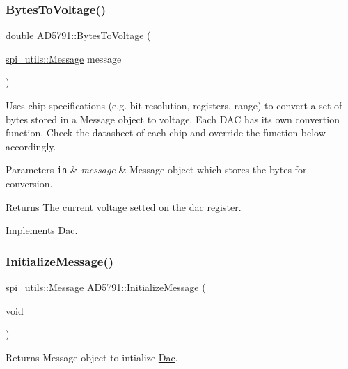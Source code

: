\subsubsection{\texorpdfstring{Bytes\+To\+Voltage()}{BytesToVoltage()}}
{\footnotesize\ttfamily double A\+D5791\+::\+Bytes\+To\+Voltage (\begin{DoxyParamCaption}\item[{\mbox{\hyperlink{structspi__utils_1_1Message}{spi\+\_\+utils\+::\+Message}}}]{message }\end{DoxyParamCaption})\hspace{0.3cm}{\ttfamily [virtual]}}

Uses chip specifications (e.\+g. bit resolution, registers, range) to convert a set of bytes stored in a Message object to voltage. Each D\+AC has its own convertion function. Check the datasheet of each chip and override the function below accordingly. 
\begin{DoxyParams}[1]{Parameters}
\mbox{\tt in}  & {\em message} & Message object which stores the bytes for conversion. \\
\hline
\end{DoxyParams}
\begin{DoxyReturn}{Returns}
The current voltage setted on the dac register. 
\end{DoxyReturn}


Implements \mbox{\hyperlink{classDac_a1df39dc8c6e5b50afd07b6dd8a6b9300}{Dac}}.

\mbox{\label{classAD5791_a770015b1cc9fd808356dab2f2598f894}} 
\subsubsection{\texorpdfstring{Initialize\+Message()}{InitializeMessage()}}
{\footnotesize\ttfamily \mbox{\hyperlink{structspi__utils_1_1Message}{spi\+\_\+utils\+::\+Message}} A\+D5791\+::\+Initialize\+Message (\begin{DoxyParamCaption}\item[{void}]{ }\end{DoxyParamCaption})\hspace{0.3cm}{\ttfamily [virtual]}}

\begin{DoxyReturn}{Returns}
Message object to intialize \mbox{\hyperlink{classDac}{Dac}}. 
\end{DoxyReturn}


